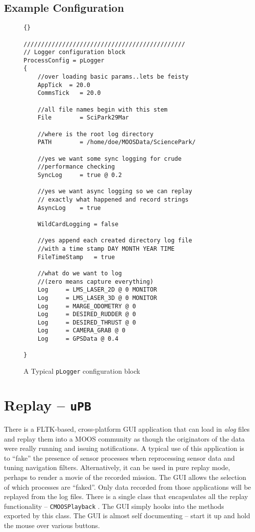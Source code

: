 \documentclass[a4paper,10pt]{article}
\newcommand{\Code}[1]{\texttt{#1} }
\newcommand{\code}[1]{\Code{#1} }
\begin{document}
\subsection{Example Configuration}
\begin{figure}[ht!]
\begin{lstlisting}[]{}

//////////////////////////////////////////////
// Logger configuration block
ProcessConfig = pLogger
{
    //over loading basic params..lets be feisty
    AppTick  = 20.0
    CommsTick   = 20.0

    //all file names begin with this stem
    File        = SciPark29Mar

    //where is the root log directory
    PATH        = /home/doe/MOOSData/SciencePark/

    //yes we want some sync logging for crude
    //performance checking
    SyncLog     = true @ 0.2

    //yes we want async logging so we can replay
    // exactly what happened and record strings
    AsyncLog    = true

    WildCardLogging = false

    //yes append each created directory log file
    //with a time stamp DAY MONTH YEAR TIME
    FileTimeStamp   = true

    //what do we want to log
    //(zero means capture everything)
    Log     = LMS_LASER_2D @ 0 MONITOR
    Log     = LMS_LASER_3D @ 0 MONITOR
    Log     = MARGE_ODOMETRY @ 0
    Log     = DESIRED_RUDDER @ 0
    Log     = DESIRED_THRUST @ 0
    Log     = CAMERA_GRAB @ 0
    Log     = GPSData @ 0.4

}

\end{lstlisting}
\caption{A Typical \code{pLogger} configuration block}
\label{fig:LoggerConfig}
\end{figure}

\newpage

\section{Replay -- \code{uPB}}
There is a FLTK-based, cross-platform GUI application that can
load in {\it{alog}} files and replay them into a MOOS community as
though the originators of the data were really running and issuing
notifications. A typical use of this application is to ``fake''
the presence of sensor processes when reprocessing sensor data and
tuning navigation filters. Alternatively, it can be used in pure
replay mode, perhaps to render a movie of the recorded mission. The
GUI allows the selection of which processes are ``faked''. Only
data recorded from those applications will be replayed from the
log files.  There is a single class that encapsulates all the
replay functionality -- \code{CMOOSPlayback}. The GUI simply hooks
into the methods exported by this class. The GUI is almost self
documenting -- start it up and hold the mouse over various buttons.
\end{document}
